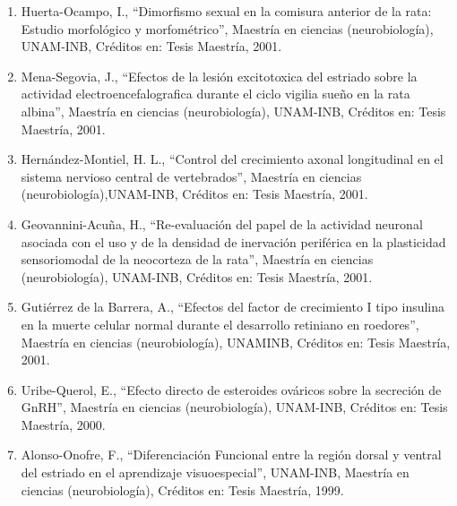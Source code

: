 \begin{enumerate}
\item Huerta-Ocampo, I., “Dimorfismo sexual en la comisura anterior de la rata: Estudio morfológico y morfométrico”, 
Maestría 
en ciencias (neurobiología), UNAM-INB, Créditos en: Tesis Maestría, 2001.

\item Mena-Segovia, J., “Efectos de la lesión excitotoxica del estriado sobre la actividad electroencefalografica durante 
el 
ciclo vigilia sueño en la rata albina”, Maestría en ciencias (neurobiología), UNAM-INB, Créditos en: Tesis Maestría, 2001.

\item Hernández-Montiel, H. L., “Control del crecimiento axonal longitudinal en el sistema nervioso central de 
vertebrados”, 
Maestría en ciencias (neurobiología),UNAM-INB, Créditos en: Tesis Maestría, 2001.

\item Geovannini-Acuña, H., “Re-evaluación del papel de la actividad neuronal asociada con el uso y de la densidad de 
inervación periférica en la plasticidad sensoriomodal de la neocorteza de la rata”, Maestría en ciencias (neurobiología), 
UNAM-INB, Créditos en: Tesis Maestría, 2001.

\item Gutiérrez de la Barrera, A., “Efectos del factor de crecimiento I tipo insulina en la muerte celular normal durante 
el 
desarrollo retiniano en roedores”, Maestría en ciencias (neurobiología), UNAMINB, Créditos en: Tesis Maestría, 2001.

\item Uribe-Querol, E., “Efecto directo de esteroides ováricos sobre la secreción de GnRH”, Maestría en ciencias 
(neurobiología), UNAM-INB, Créditos en: Tesis Maestría, 2000.

\item Alonso-Onofre, F., “Diferenciación Funcional entre la región dorsal y ventral del estriado en el aprendizaje 
visuoespecial”, UNAM-INB, Maestría en ciencias (neurobiología), Créditos en: Tesis Maestría, 
1999.

\end{enumerate}

